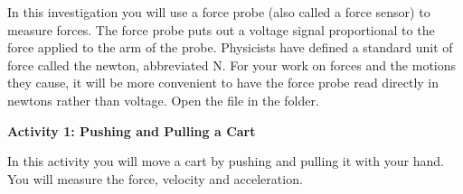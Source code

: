 In this investigation you will use a force probe (also called a force sensor) to measure forces. The force probe puts out a voltage signal proportional to the force applied to the arm of the probe. Physicists have defined a standard unit of force called the newton, abbreviated N. For your work on forces and the motions they cause, it will be more convenient to have the force probe read directly in newtons rather than voltage. 
Open the  file in the \filename{\coursefolder} folder.

%

\textbf{Activity 1: Pushing and Pulling a Cart} 

In this activity you will move a cart by pushing and pulling it with your hand.
You will measure the force, velocity and acceleration. 

